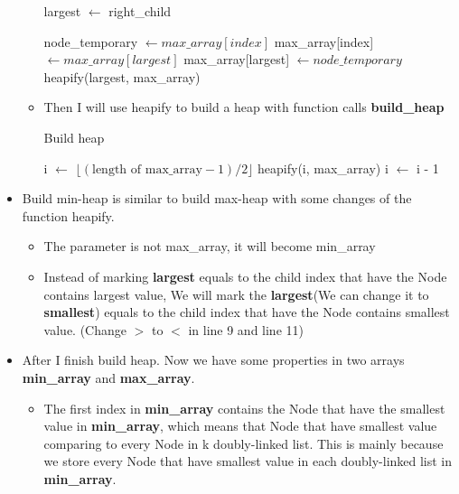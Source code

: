 \documentclass{article}
\begin{document}
\begin{itemize}
\begin{itemize}
\begin{algorithm}[H]
\begin{algorithmic}[1]
					\State largest \(\gets\) right\_child
				\EndIf{}

					\State node\_temporary \(\gets max\_array[index]\)
					\State max\_array[index] \(\gets  max\_array[largest]\)
					\State  max\_array[largest] \(\gets node\_temporary\)
					\State heapify(largest, max\_array) 	
				\EndIf{}
				\EndFunction{}
			\end{algorithmic}
			\end{algorithm}
			\item Then I will use heapify to build a heap with function calls \textbf{build\_heap}
			\begin{algorithm}[H]
				\caption{Build heap}
			\begin{algorithmic}[1]
				\State i \(\gets\) \(\lfloor (\text{length of max\_array} - 1) / 2 \rfloor\) 
				\State heapify(i, max\_array)
				\State i \(\gets\) i - 1
				\EndWhile{}
				\State {}
				\EndFunction{}
			\end{algorithmic}
			\end{algorithm}
		\end{itemize}
		\item Build min-heap is similar to build max-heap with some changes of the function heapify.
		\begin{itemize}
			\item The parameter is not max\_array, it will become min\_array
			\item Instead of marking \textbf{largest} equals to the child index that have the Node contains largest value, We will mark the \textbf{largest}(We can change it to \textbf{smallest}) equals to the child index that have the Node contains smallest value. (Change \(>\) to \(<\) in line 9 and line 11)
		\end{itemize}
		\item After I finish build heap. Now we have some properties in two arrays \textbf{min\_array} and \textbf{max\_array}.
		\begin{itemize}
			\item The first index in \textbf{min\_array} contains the Node that have the smallest value in \textbf{min\_array}, which means that Node that have smallest value comparing to every Node in k doubly-linked list. This is mainly because we store every Node that have smallest value in each doubly-linked list in \textbf{min\_array}.

\end{itemize}
\end{itemize}
\end{document}
